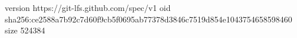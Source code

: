version https://git-lfs.github.com/spec/v1
oid sha256:ce2588a7b92c7d60f9cb5f0695ab77378d3846c7519d854e1043754658598460
size 524384
